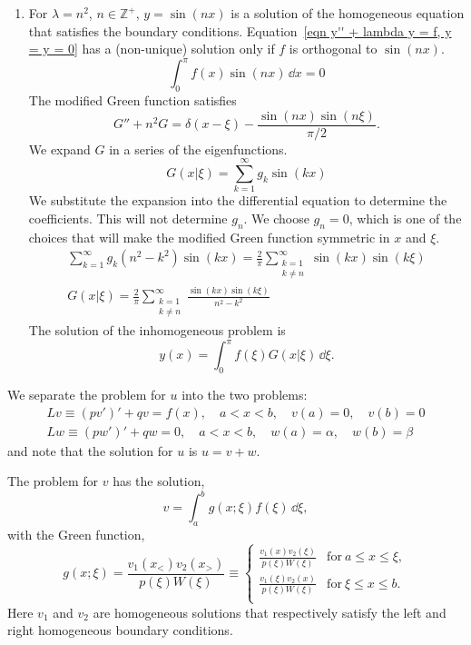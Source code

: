 {\begin{Solution}
\begin{enumerate}
  \item
    For $\lambda = n^2$, $n \in \mathbb{Z}^+$, $y = \sin(n x)$ is a solution of the
    homogeneous equation that satisfies the boundary conditions.
    Equation~\ref{eqn y'' + lambda y = f, y = y = 0} has a (non-unique) 
    solution only if $f$ is orthogonal to $\sin(n x)$.
    \[
    \int_0^\pi f(x) \sin(n x) \,\dd x = 0
    \]
    The modified Green function satisfies
    \[
    G'' + n^2 G = \delta(x - \xi) - \frac{ \sin(n x) \sin(n \xi) }{ \pi / 2 }.
    \]
    We expand $G$ in a series of the eigenfunctions.
    \[
    G(x|\xi) = \sum_{k = 1}^\infty g_k \sin(k x)
    \]
    We substitute the expansion into the differential equation to determine the
    coefficients.  This will not determine $g_n$.  We choose $g_n = 0$, which is 
    one of the choices that will make the modified Green function symmetric in
    $x$ and $\xi$.
    \begin{gather*}
      \sum_{k = 1}^\infty g_k \left( n^2 - k^2 \right) \sin(k x) 
      = \frac{2}{\pi} \sum_{\substack{k = 1 \\ k \neq n}}^\infty \sin(k x) \sin(k \xi)
      \\
      \boxed{
        G(x|\xi) = \frac{2}{\pi} \sum_{\substack{k = 1 \\ k \neq n}}^\infty 
        \frac{ \sin(k x) \sin(k \xi) }{ n^2 - k^2 }
        }
    \end{gather*}
    The solution of the inhomogeneous problem is
    \[
    y(x) = \int_0^\pi f(\xi) G(x|\xi) \,\dd \xi.
    \]
  \end{enumerate}
\end{Solution}









\begin{Solution}
  \label{solution Lu=pu+qu=f}
  We separate the problem for $u$ into the two problems:
  \begin{gather*}
    L v \equiv (p v')' + q v = f(x), \quad a < x < b, 
    \quad v(a) = 0, \quad v(b) = 0 \\
    L w \equiv (p w')' + q w = 0, \quad a < x < b, 
    \quad w(a) = \alpha, \quad w(b) = \beta 
  \end{gather*}
  and note that the solution for $u$ is $u = v + w$.  

  The problem for $v$ has the solution,
  \[
  v = \int_a^b g(x;\xi) f(\xi) \,\dd \xi,
  \]
  with the Green function,
  \[
  g(x;\xi) = \frac{v_1(x_<) v_2(x_>)}{ p(\xi) W(\xi) } \equiv
  \begin{cases}
    \frac{v_1(x) v_2(\xi)}{ p(\xi) W(\xi) } &\mathrm{for}\ a \leq x \leq \xi, \\
    \frac{v_1(\xi) v_2(x)}{ p(\xi) W(\xi) } &\mathrm{for}\ \xi \leq x \leq b. \\
  \end{cases}
  \]
  Here $v_1$ and $v_2$ are homogeneous solutions that respectively satisfy 
  the left and right homogeneous boundary conditions.


\end{Solution}}
